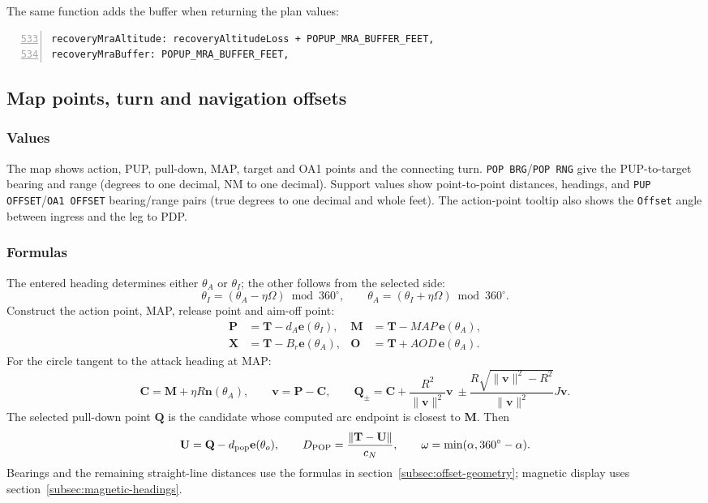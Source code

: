 \documentclass[10pt,a4paper]{amsart}
\begin{document}
The same function adds the buffer when returning the plan values:
\begin{lstlisting}[numbers=left,firstnumber=533,numberstyle=\tiny,xleftmargin=2em]
recoveryMraAltitude: recoveryAltitudeLoss + POPUP_MRA_BUFFER_FEET,
recoveryMraBuffer: POPUP_MRA_BUFFER_FEET,
\end{lstlisting}

\subsection{Map points, turn and navigation offsets}\label{subsec:popup-map}
\subsubsection*{Values}
The map shows action, PUP, pull-down, MAP, target and OA1 points
and the connecting turn. \texttt{POP BRG}/\texttt{POP RNG} give the
PUP-to-target bearing and range (degrees to one decimal, NM to one
decimal). Support values show point-to-point distances, headings,
and \texttt{PUP OFFSET}/\texttt{OA1 OFFSET} bearing/range pairs
(true degrees to one decimal and whole feet). The action-point tooltip
also shows the \texttt{Offset} angle between ingress and the leg to PDP.

\subsubsection*{Formulas}
The entered heading determines either $\theta_A$ or $\theta_I$;
the other follows from the selected side:
\[
 \theta_I=(\theta_A-\eta\Omega)\bmod360^\circ,\qquad
 \theta_A=(\theta_I+\eta\Omega)\bmod360^\circ.
\]
Construct the action point, MAP, release point and aim-off point:
\begin{align*}
 \mathbf P&=\mathbf T-d_A\mathbf e(\theta_I),&
 \mathbf M&=\mathbf T-MAP\,\mathbf e(\theta_A),\\
 \mathbf X&=\mathbf T-B_r\mathbf e(\theta_A),&
 \mathbf O&=\mathbf T+AOD\,\mathbf e(\theta_A).
\end{align*}
For the circle tangent to the attack heading at MAP:
\[
 \mathbf C=\mathbf M+\eta R\mathbf n(\theta_A),\qquad
 \mathbf v=\mathbf P-\mathbf C,\qquad
 \mathbf Q_\pm=\mathbf C+\frac{R^2}{\|\mathbf v\|^2}\mathbf v
       \ \pm\frac{R\sqrt{\|\mathbf v\|^2-R^2}}{\|\mathbf v\|^2}J\mathbf v.
\]
The selected pull-down point $\mathbf Q$ is the candidate whose
computed arc endpoint is closest to $\mathbf M$. Then
\[
 \mathbf U=\mathbf Q-d_{\rm pop}\mathbf e(\theta_o),\qquad
 D_{\rm POP}=\frac{\|\mathbf T-\mathbf U\|}{c_N},\qquad
 \omega=\min(\alpha,360^\circ-\alpha).
\]
Bearings and the remaining straight-line distances use the formulas
in section~\ref{subsec:offset-geometry}; magnetic display uses
section~\ref{subsec:magnetic-headings}.
\end{document}

